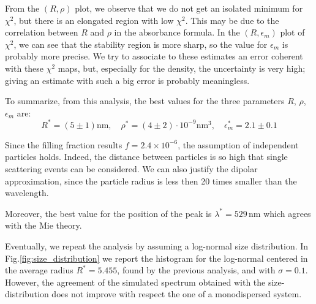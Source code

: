 \documentclass[prb,twocolumn]{revtex4-1}
\begin{document}
From the \( (R,\rho) \) plot, we observe that we do not get an isolated minimum for $\chi^2$, but there is an elongated region with low $\chi^2$. This may be due to the correlation between $R$ and $\rho$ in the absorbance formula. In the \( (R,\epsilon_m) \) plot of $\chi^2$, we can see that the stability region is more sharp, so the value for $\epsilon_m$ is probably more precise. We try to associate to these estimates an error coherent with these $\chi^2$ maps, but, especially for the density, the uncertainty is very high; giving an estimate with such a big error is probably meaningless.

To summarize, from this analysis, the best values for the three parameters $R$, $\rho$, $\epsilon_m$ are:
\begin{equation*}
    R^* = (5\pm 1)  \text{nm}, \quad \rho^* = (4 \pm 2) \cdot 10^{-9} \text{nm}^3 , \quad \epsilon_m^* = 2.1 \pm 0.1
\end{equation*}

Since the filling fraction results $f=2.4 \times 10^{-6}$, the assumption of independent particles holds. Indeed, the distance between particles is so high that single scattering events can be considered. We can also justify the dipolar approximation, since the particle radius is less then 20 times smaller than the wavelength.

Moreover, the best value for the position of the peak is $\lambda^* = 529\, \text{nm}$ which agrees with the Mie theory. 

Eventually, we repeat the analysis by assuming a log-normal size distribution. In Fig.\ref{fig:size_distribution} we report the histogram for the log-normal centered in the average radius $R^*=5.455$, found by the previous analysis, and with $\sigma=0.1$. However, the agreement of the simulated spectrum obtained with the size-distribution does not improve with respect the one of a monodispersed system.
\end{document}
